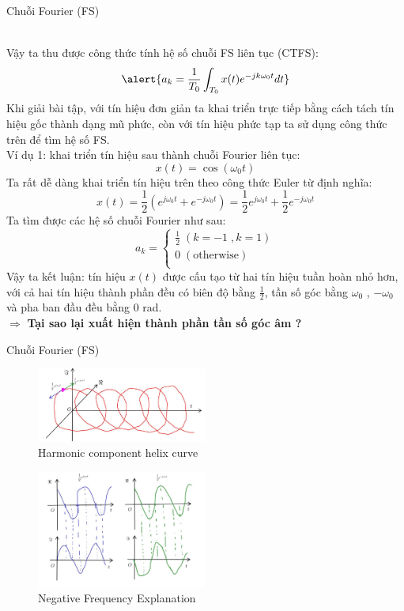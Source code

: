\documentclass[8pt]{beamer}
\begin{document}
\begin{frame}{Chuỗi Fourier (FS)}

\\ Vậy ta thu được công thức tính hệ số chuỗi FS liên tục (CTFS):
$$\alert{a_{k}=\frac{1}{T_{0}}\int_{T_{0}}x(t)e^{-jk\omega_{0}t}dt}$$
Khi giải bài tập, với tín hiệu đơn giản ta khai triển trực tiếp bằng cách tách tín hiệu gốc thành dạng mũ phức, còn với tín hiệu phức tạp ta sử dụng công thức trên để tìm hệ số FS.
\\ Ví dụ 1: khai triển tín hiệu sau thành chuỗi Fourier liên tục:
$$x(t)=\cos(\omega_{0}t)$$
Ta rất dễ dàng khai triển tín hiệu trên theo công thức Euler từ định nghĩa:
$$x(t)=\frac{1}{2}\left(e^{j\omega_{0}t}+e^{-j\omega_{0}t}\right)=\frac{1}{2}e^{j\omega_{0}t}+\frac{1}{2}e^{-j\omega_{0}t}$$
Ta tìm được các hệ số chuỗi Fourier như sau:
\begin{equation*}
	a_{k}=
	\begin{cases}
		\frac{1}{2}\; (k=-1\; , k=1)	\\
		0 \;(\text{otherwise})\\
\end{cases}
\end{equation*}
Vậy ta kết luận: tín hiệu $x(t)$ được cấu tạo từ hai tín hiệu tuần hoàn nhỏ hơn, với cả hai tín hiệu thành phần đều có \alert{biên độ} bằng $\frac{1}{2}$, \alert{tần số góc} bằng $\omega_{0}$ , $-\omega_{0}$ và \alert{pha ban đầu} đều bằng $0$ rad. \\$\Rightarrow$ \textbf{Tại sao lại xuất hiện thành phần tần số góc âm ?}
\end{frame}
\begin{frame}{Chuỗi Fourier (FS)}
\begin{figure}[h]
			\includegraphics[width=0.5\textwidth]{helix.jpg}
			\caption{Harmonic component helix curve}\label{fig:re11}
		\end{figure}
\begin{figure}[h]
			\includegraphics[width=0.5\textwidth]{imaginary.jpg}
			\caption{Negative Frequency Explanation}\label{fig:re11}

		\end{figure}
\end{frame}
\end{document}
